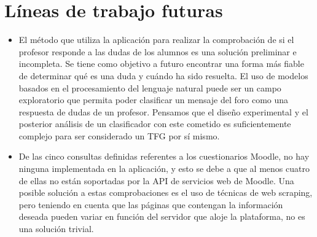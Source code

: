 
\section{Líneas de trabajo futuras}
\begin{itemize}
	\item
	El método que utiliza la aplicación para realizar la comprobación de si el profesor responde a las dudas de los alumnos es una solución preliminar e incompleta. Se tiene como objetivo a futuro encontrar una forma más fiable de determinar qué es una duda y cuándo ha sido resuelta.
	El uso de modelos basados en el procesamiento del lenguaje natural puede ser un campo exploratorio que permita poder clasificar un mensaje del foro como una respuesta de dudas de un profesor. Pensamos que el diseño experimental y el posterior análisis de un clasificador con este cometido es suficientemente complejo para ser considerado un TFG por sí mismo.
	\item
	De las cinco consultas definidas referentes a los cuestionarios Moodle, no hay ninguna implementada en la aplicación, y esto se debe a que al menos cuatro de ellas no están soportadas por la API de servicios web de Moodle.
	Una posible solución a estas comprobaciones es el uso de técnicas de web scraping, pero teniendo en cuenta que las páginas que contengan la información deseada pueden variar en función del servidor que aloje la plataforma, no es una solución trivial.
\end{itemize}
